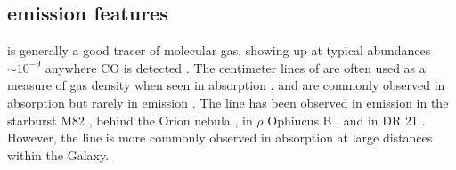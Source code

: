 %
%
%






\subsection{\formaldehyde emission features}
\label{sec:h2coemission}

\formaldehyde is generally a good tracer of molecular gas, showing up at typical
abundances $\sim10^{-9}$ \hh anywhere CO is detected \citep[e.g.][]{Mangum1993a}.
The centimeter lines of \ortho are often used as a measure of gas density when
seen in absorption \citep[e.g.][]{Ginsburg2011a,Zeiger2010a}.
\ortho \oneone and \twotwo are commonly observed in absorption
but rarely in emission \citep[e.g.][]{Mangum1993a,Araya2007b}.  The \twotwo
line has been observed in emission in the starburst M82 \citep{Mangum2008a},
behind the Orion nebula
\citep{Evans1975a,Kutner1976a,Batrla1983a,Johnston1983a,Bastien1985a,Wilson1989a},
in $\rho$ Ophiucus B
\citep{Loren1980a,Loren1983a,Martin-Pintado1983a,Wadiak1985a}, and in DR 21
\citep{Wilson1982a,Johnston1984a}.  However, the \twotwo line is more commonly
observed in absorption at large distances within the Galaxy.

